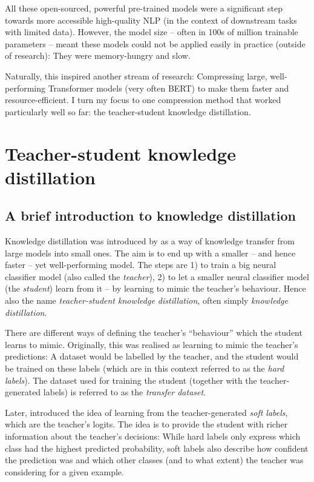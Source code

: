 \documentclass[bsc,frontabs,twoside,singlespacing,parskip,deptreport]{infthesis}
\begin{document}
{{{      All these open-sourced, powerful pre-trained models were a significant step towards more accessible high-quality NLP (in the context of downstream tasks with limited data). However, the model size -- often in 100s of million trainable parameters -- meant these models could not be applied easily in practice (outside of research): They were memory-hungry and slow.
      
      Naturally, this inspired another stream of research: Compressing large, well-performing Transformer models (very often BERT) to make them faster and resource-efficient.
      I turn my focus to one compression method that worked particularly well so far: the teacher-student knowledge distillation.
    }
  }

  \section{Teacher-student knowledge distillation}{
    \label{sec:KD}
    \subsection{A brief introduction to knowledge distillation}{
      \label{sec:KD-intro}
      Knowledge distillation was introduced by \citep{Bucila_2006} as a way of knowledge transfer from large models into small ones. The aim is to end up with a smaller -- and hence faster -- yet well-performing model. The steps are 1) to train a big neural classifier model (also called the \textit{teacher}), 2) to let a smaller neural classifier model (the \textit{student}) learn from it -- by learning to mimic the teacher's behaviour. Hence also the name \textit{teacher-student knowledge distillation}, often simply \textit{knowledge distillation}.
      
      There are different ways of defining the teacher's ``behaviour'' which the student learns to mimic. Originally, this was realised as learning to mimic the teacher's predictions: A dataset would be labelled by the teacher, and the student would be trained on these labels (which are in this context referred to as the \textit{hard labels}). The dataset used for training the student (together with the teacher-generated labels) is referred to as the \textit{transfer dataset}.

      Later, \citet{Ba_2013} introduced the idea of learning from the teacher-generated \textit{soft labels}, which are the teacher's logits. The idea is to provide the student with richer information about the teacher's decisions: While hard labels only express which class had the highest predicted probability, soft labels also describe how confident the prediction was and which other classes (and to what extent) the teacher was considering for a given example.

}}}
\end{document}
